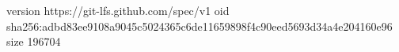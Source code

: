 version https://git-lfs.github.com/spec/v1
oid sha256:adbd83ee9108a9045c5024365c6de11659898f4c90eed5693d34a4e204160e96
size 196704
